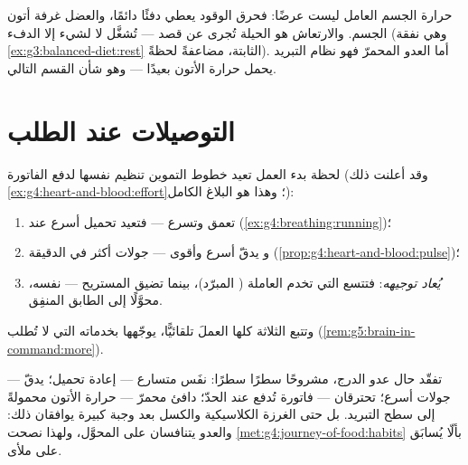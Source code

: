 \begin{remark}\label{rem:g7:organs-at-work:warmth}
حرارة الجسم العامل ليست عرضًا: فحرق الوقود يعطي دفئًا دائمًا،
والعضل غرفة أتون الجسم. والارتعاش هو الحيلة تُجرى عن قصد --- 
تُشغَّل لا لشيء إلا الدفء (وهي نفقة
\cref{ex:g3:balanced-diet:rest} الثابتة، مضاعفةً لحظةً). أما 
العدو المحمرّ فهو نظام التبريد يحمل حرارة الأتون بعيدًا --- وهو شأن
القسم التالي.
\end{remark}

\section{التوصيلات عند الطلب}

\begin{proposition}\label{prop:g7:organs-at-work:supply}
لحظة بدء العمل تعيد خطوط التموين تنظيم نفسها لدفع الفاتورة
(وقد أعلنت ذلك \cref{ex:g4:heart-and-blood:effort}؛ وهذا هو
البلاغ الكامل):
\begin{enumerate}
  \item \emph{} تعمق وتسرع --- فتعيد تحميل 
        أسرع عند 
        (\cref{ex:g4:breathing:running})؛
  \item و\emph{} يدقّ أسرع وأقوى --- جولات أكثر في الدقيقة
        (\cref{prop:g4:heart-and-blood:pulse})؛
  \item {} \emph{يُعاد توجيهه}: فتتسع  التي تخدم
         العاملة ( المبرّد)، بينما تضيق 
         المستريح ---  نفسه، محوَّلًا إلى الطابق
        المنفِق.
\end{enumerate}
وتتبع الثلاثة كلها العملَ تلقائيًّا، يوجّهها  بخدماته التي لا
تُطلب (\cref{rem:g5:brain-in-command:more}).
\end{proposition}
\admitted

\begin{example}\label{ex:g7:organs-at-work:felt}
تفقّد حال عدو الدرج، مشروحًا سطرًا سطرًا: نفَس متسارع --- إعادة
تحميل؛  يدقّ --- جولات أسرع؛  تحترقان --- فاتورة 
تُدفع عند الحدّ؛  دافئ محمرّ --- حرارة الأتون محمولةً إلى سطح
التبريد. بل حتى الغرزة الكلاسيكية والكسل بعد وجبة كبيرة يوافقان
ذلك:  والعدو يتنافسان على  المحوَّل، ولهذا نصحت
\cref{met:g4:journey-of-food:habits} بألّا يُسابَق على  ملأى.
\end{example}

